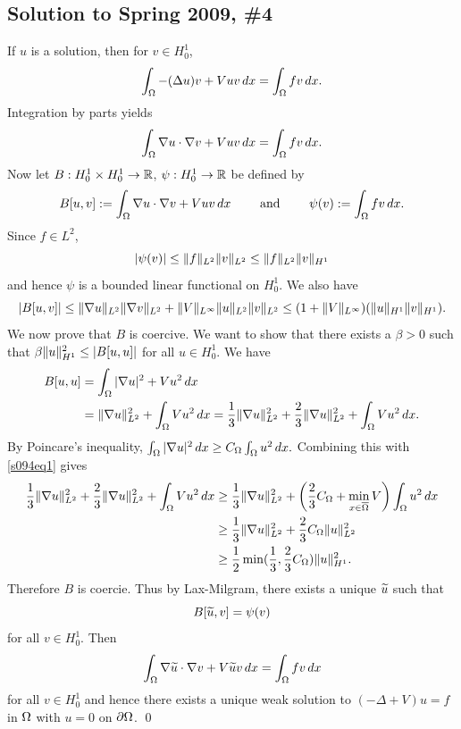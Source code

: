 \subsection*{Solution to Spring 2009, \#4}\label{s094}
If $u$ is a solution, then for $v \in H_{0}^{1}$,
$$\int_{\Omega}-(\Delta u)v + Vuv\, dx = \int_{\Omega}fv\, dx.$$
Integration by parts yields
$$\int_{\Omega}\nabla u \cdot \nabla v + Vuv\, dx = \int_{\Omega}fv\, dx.$$
Now let $B: H_{0}^{1} \times H_{0}^{1} \rightarrow \mathbb{R}$, $\psi: H_{0}^{1} \rightarrow \mathbb{R}$ be defined by
$$B[u, v] := \int_{\Omega}\nabla u \cdot \nabla v + Vuv\, dx \quad \quad \text{ and } \quad\quad \psi(v) := \int_{\Omega}fv\, dx.$$
Since $f \in L^{2}$,
$$|\psi(v)| \leq \| f \|_{L^{2}}\| v \|_{L^{2}} \leq \| f \|_{L^{2}}\| v \|_{H^{1}}$$
and hence $\psi$ is a bounded linear functional on $H_{0}^{1}$. We also have
$$|B[u, v]| \leq \| \nabla u \|_{L^{2}}\| \nabla v \|_{L^{2}} + \| V \|_{L^{\infty}}\| u \|_{L^{2}}\| v \|_{L^{2}} \leq (1 + \| V \|_{L^{\infty}})(\| u \|_{H^{1}}\| v \|_{H^{1}}).$$
We now prove that $B$ is coercive. We want to show that there exists a $\beta > 0$ such that $\beta\| u \|_{H^{1}}^{2} \leq |B[u, u]|$ for all $u \in H_{0}^{1}$. We have
\begin{align}\label{s094eq1}
\begin{aligned}
B[u, u] &= \int_{\Omega}|\nabla u|^{2} + Vu^{2}\, dx\\
&= \| \nabla u \|_{L^{2}}^{2} + \int_{\Omega}Vu^{2}\, dx = \frac{1}{3}\| \nabla u \|_{L^{2}}^{2} + \frac{2}{3}\| \nabla u \|_{L^{2}}^{2} + \int_{\Omega}Vu^{2}\, dx.
\end{aligned}
\end{align}
By Poincare's inequality, $\int_{\Omega}|\nabla u|^{2}\, dx \geq C_{\Omega}\int_{\Omega}u^{2}\, dx.$ Combining this with \eqref{s094eq1} gives
\begin{align*}
\frac{1}{3}\| \nabla u \|_{L^{2}}^{2} + \frac{2}{3}\| \nabla u \|_{L^{2}}^{2} + \int_{\Omega}Vu^{2}\, dx &\geq \frac{1}{3}\| \nabla u \|_{L^{2}}^{2}+ \bigg(\frac{2}{3}C_{\Omega} + \min_{x \in \overline{\Omega}}V\bigg)\int_{\Omega}u^{2}\, dx\\
&\geq \frac{1}{3}\| \nabla u \|_{L^{2}}^{2} + \frac{2}{3}C_{\Omega}\| u \|_{L^{2}}^{2}\\
&\geq \frac{1}{2}\min(\frac{1}{3}, \frac{2}{3}C_{\Omega})\| u \|_{H^{1}}^{2}.
\end{align*}
Therefore $B$ is coercie. Thus by Lax-Milgram, there exists a unique $\widetilde{u}$ such that $$B[\widetilde{u}, v] = \psi(v)$$ for all $v \in H_{0}^{1}$. Then
$$\int_{\Omega}\nabla \widetilde{u} \cdot \nabla v + V\widetilde{u}v\, dx = \int_{\Omega}fv\, dx$$
for all $v \in H_{0}^{1}$ and hence there exists a unique weak solution to $(-\Delta + V)u = f$ in $\Omega$ with $u = 0$ on $\partial\Omega$.
\hfill\qed

